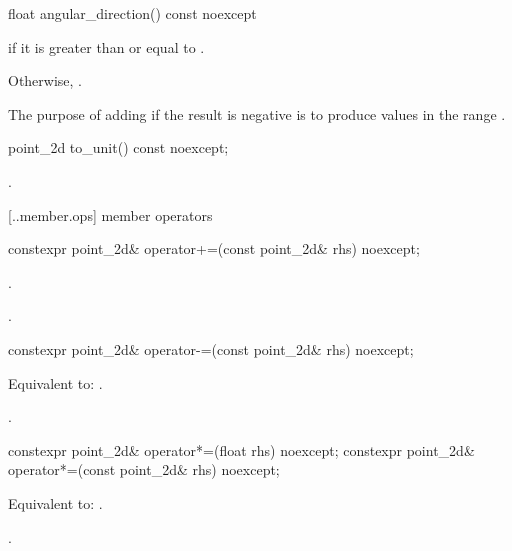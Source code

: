 %
\begin{itemdecl}
float angular_direction() const noexcept
\end{itemdecl}
\begin{itemdescr}
\pnum
\returns
{} if it is greater than or equal to .

\pnum
Otherwise, . 

\pnum
\begin{note}
The purpose of adding  if the result is negative is to produce values in the range .
\end{note}
\end{itemdescr}

%
\begin{itemdecl}
point_2d to_unit() const noexcept;
\end{itemdecl}
\begin{itemdescr}
\pnum
\returns
{}.
\end{itemdescr}

 [\iotwod.\pointtwod.member.ops] { member operators}

%
\begin{itemdecl}
constexpr point_2d& operator+=(const point_2d& rhs) noexcept;
\end{itemdecl}
\begin{itemdescr}
\pnum
\effects
{}.
	
\pnum
\returns
{}.
\end{itemdescr}

%
\begin{itemdecl}
constexpr point_2d& operator-=(const point_2d& rhs) noexcept;
\end{itemdecl}
\begin{itemdescr}
\pnum
\effects
Equivalent to: .

\pnum
\returns
{}.
\end{itemdescr}

%
\begin{itemdecl}
constexpr point_2d& operator*=(float rhs) noexcept;
constexpr point_2d& operator*=(const point_2d& rhs) noexcept;
\end{itemdecl}
\begin{itemdescr}
\pnum
\effects
Equivalent to: .

\pnum
\returns
{}.
\end{itemdescr}

